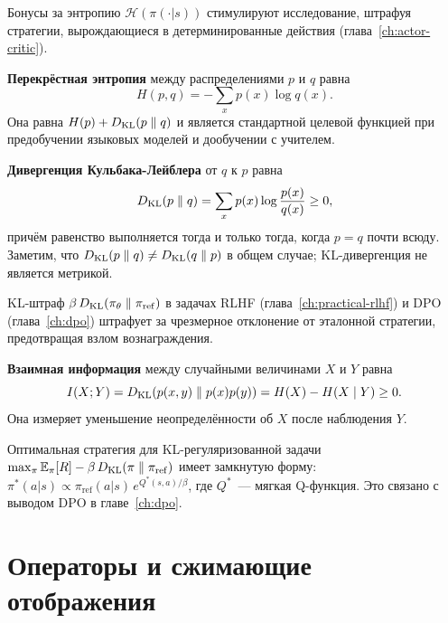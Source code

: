 Бонусы за энтропию $\mathcal{H}(\pi(\cdot|s))$ стимулируют исследование, штрафуя стратегии, вырождающиеся в детерминированные действия (глава~\ref{ch:actor-critic}).

\begin{definition}
\label{def:cross-entropy}
\textbf{Перекрёстная энтропия} между распределениями $p$ и $q$ равна
\[
    H(p,q) = -\sum_x p(x)\log q(x).
\]
Она равна $H(p) + D_{\mathrm{KL}}\!\left(p\;\|\;q\right)$ и является стандартной целевой функцией при предобучении языковых моделей и дообучении с учителем.
\end{definition}

\begin{definition}[KL-дивергенция]
\label{def:kl}
\textbf{Дивергенция Кульбака-Лейблера} от $q$ к $p$ равна
\[
    D_{\mathrm{KL}}\!\left(p\;\|\;q\right) = \sum_x p(x)\log\frac{p(x)}{q(x)} \geq 0,
\]
причём равенство выполняется тогда и только тогда, когда $p = q$ почти всюду. Заметим, что $D_{\mathrm{KL}}\!\left(p\;\|\;q\right) \neq D_{\mathrm{KL}}\!\left(q\;\|\;p\right)$ в общем случае; KL-дивергенция не является метрикой.
\end{definition}

KL-штраф $\beta\,D_{\mathrm{KL}}\!\left(\pi_\theta\;\|\;\pi_\mathrm{ref}\right)$ в задачах RLHF (глава~\ref{ch:practical-rlhf}) и DPO (глава~\ref{ch:dpo}) штрафует за чрезмерное отклонение от эталонной стратегии, предотвращая взлом вознаграждения.

\begin{definition}
\label{def:mutual-info}
\textbf{Взаимная информация} между случайными величинами $X$ и $Y$ равна
\[
    I(X;Y) = D_{\mathrm{KL}}\!\left(p(x,y)\;\|\;p(x)p(y)\right)
            = H(X) - H(X \mid Y) \geq 0.
\]
Она измеряет уменьшение неопределённости об $X$ после наблюдения $Y$.
\end{definition}

\begin{example}[RL с KL-регуляризацией]
Оптимальная стратегия для KL-регуляризованной задачи $\max_\pi \operatorname{\mathbb{E}}_\pi[R] - \beta\,D_{\mathrm{KL}}\!\left(\pi\;\|\;\pi_\mathrm{ref}\right)$ имеет замкнутую форму: $\pi^*(a|s) \propto \pi_\mathrm{ref}(a|s)\, e^{Q^*(s,a)/\beta}$, где $Q^*$~--- мягкая Q-функция. Это связано с выводом DPO в главе~\ref{ch:dpo}.
\end{example}

\section{Операторы и сжимающие отображения}
\label{app:operators}

